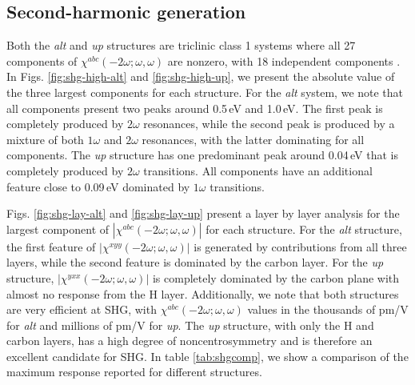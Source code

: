 \documentclass[pss]{wiley2sp} %
\begin{document}
\subsection{Second-harmonic generation}

Both the \emph{alt} and \emph{up} structures are triclinic class 1 systems
where all 27 components of $\chi^{abc}(-2\omega;\omega,\omega)$ are nonzero,
with 18 independent components \cite{popovbook}. In Figs. 
\ref{fig:shg-high-alt} and \ref{fig:shg-high-up}, we present the absolute value
of the three largest components for each structure. For the \emph{alt} system,
we note that all components present two peaks around 0.5\,eV and 1.0\,eV. The
first peak is completely produced by $2\omega$ resonances, while the second
peak is produced by a mixture of both $1\omega$ and $2\omega$ resonances, with
the latter dominating for all components. The \emph{up} structure  has one
predominant peak around 0.04\,eV that is completely produced by $2\omega$
transitions. All components have an additional feature close to 0.09\,eV
dominated by $1\omega$ transitions.

Figs. \ref{fig:shg-lay-alt} and \ref{fig:shg-lay-up} present a layer by layer
analysis for the largest component of $|\chi^{abc}(-2\omega;\omega,\omega)|$
for each structure. For the \emph{alt} structure, the first feature of
$|\chi^{xyy}(-2\omega;\omega,\omega)|$ is generated by contributions from all
three layers, while the second feature is dominated by the carbon layer. For the
\emph{up} structure, $|\chi^{yxx}(-2\omega;\omega,\omega)|$ is completely
dominated by the carbon plane with almost no response from the H layer.
Additionally, we note that both structures are very efficient at SHG, with
$\chi^{abc}(-2\omega;\omega,\omega)$ values in the thousands of pm/V for
\emph{alt} and millions of pm/V for \emph{up}. The \emph{up} structure, with
only the H and carbon layers, has a high degree of noncentrosymmetry and is
therefore an excellent candidate for SHG. In table \ref{tab:shgcomp}, we show a
comparison of the maximum response reported for different structures.
\end{document}

